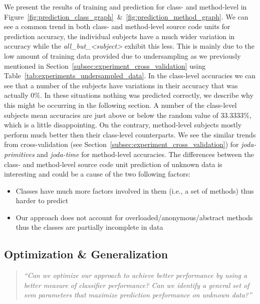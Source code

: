 We present the results of training and prediction for class- and method-level in Figure~\ref{fig:prediction_class_graph}~\&~\ref{fig:prediction_method_graph}. We can see a common trend in both class- and method-level source code units for prediction accuracy, the individual subjects have a much wider variation in accuracy while the \emph{all\_but\_<subject>} exhibit this less. This is mainly due to the low amount of training data provided due to undersampling as we previously mentioned in Section~\ref{subsec:experiment_cross_validation} using Table~\ref{tab:experiments_undersampled_data}. In the class-level accuracies we can see that a number of the subjects have variations in their accuracy that was actually 0\%. In these situations nothing was predicted correctly, we describe why this might be occurring in the following section. A number of the class-level subjects mean accuracies are just above or below the random value of 33.3333\%, which is a little disappointing. On the contrary, method-level subjects mostly perform much better then their class-level counterparts. We see the similar trends from cross-validation (see Section~\ref{subsec:experiment_cross_validation}) for \emph{joda-primitives} and \emph{joda-time} for method-level accuracies. The differences between the class- and method-level source code unit prediction of unknown data is interesting and could be a cause of the two following factors: 

\begin{itemize}
  \item Classes have much more factors involved in them (i.e., a set of methods) thus harder to predict
  \item Our approach does not account for overloaded/anonymous/abstract methods thus the classes are partially incomplete in data
\end{itemize}


\subsection{Optimization \& Generalization}
\label{subsec:experiment_optimization_generalization}
\begin{quote}
	\emph{``Can we optimize our approach to achieve better performance by using a better measure of classifier performance? Can we identify a general set of \gls{svm} parameters that maximize prediction performance on unknown data?''}
\end{quote}

